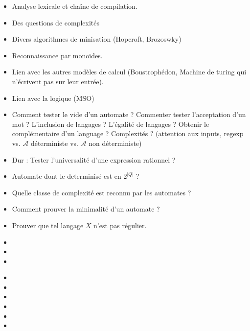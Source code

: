 \documentclass{agregfiche}
\begin{document}
\secidees
\begin{itemize}
\item Analyse lexicale et chaîne de compilation.
\item Des questions de complexités
\item Divers algorithmes de minisation (Hopcroft, Brozoswky)
\item Reconnaissance par monoïdes.
\item Lien avec les autres modèles de calcul (Boustrophédon, Machine de turing
    qui n'écrivent pas sur leur entrée).
\item Lien avec la logique (MSO)
\end{itemize}



\secquestionsclassiques
\begin{itemize}
\item Comment tester le vide d'un automate ? Commenter tester l'acceptation d'un mot ? L'inclusion de langages ? L'égalité de langages ? Obtenir le complémentaire d'un language ? Complexités ? (attention aux inputs, regexp vs. $\mathcal{A}$ déterministe vs. $\mathcal{A}$ non déterministe)
\item Dur : Tester l'universalité d'une expression rationnel ?
\item Automate dont le determinisé est en $2^{|Q|}$ ?
\item Quelle classe de complexité est reconnu par les automates ?
\item Comment prouver la minimalité d'un automate ?
\item Prouver que tel langage $X$ n'est pas régulier.
\end{itemize}

\secreferences
\begin{itemize}
\item 
\item 
\item 
\end{itemize}

\secdev
\begin{itemize}
\item 
\item 
\item 
\item {}
\item {}
\item {}

\end{itemize}
\end{document}
